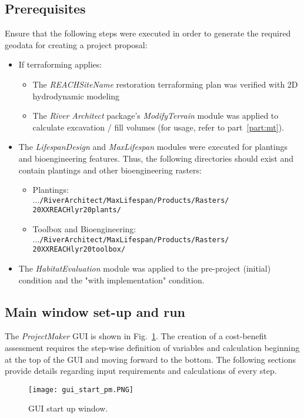 \subsection{Prerequisites}\label{sec:pmprereq}
Ensure that the following steps were executed in order to generate the required geodata for creating a project proposal:
\begin{itemize}
\item If terraforming applies:
  \begin{itemize}
  \item The \emph{REACH{\myUnderscore}SiteName} restoration terraforming plan was verified with 2D hydrodynamic modeling
  \item The \emph{River Architect} package's \emph{ModifyTerrain} module was applied to calculate excavation / fill volumes (for usage, refer to part~\ref{part:mt}).
  \end{itemize}
\item The \emph{LifespanDesign} and \emph{MaxLifespan} modules were executed for plantings and bioengineering features. Thus, the following directories should exist and contain plantings and other bioengineering rasters:
  \begin{itemize}
  \item Plantings:\\
    \texttt{$\ldots{}$/RiverArchitect/MaxLifespan/Products/Rasters/}\\ \texttt{20XX{\myUnderscore}REACH{\myUnderscore}lyr20{\myUnderscore}plants/}
  \item Toolbox and Bioengineering:\\
    \texttt{$\ldots{}$/RiverArchitect/MaxLifespan/Products/Rasters/}\\ \texttt{20XX{\myUnderscore}REACH{\myUnderscore}lyr20{\myUnderscore}toolbox/}
  \end{itemize}
\item The \emph{HabitatEvaluation} module was applied to the pre-project (initial) condition and the "with implementation" condition.
\end{itemize}

\subsection{Main window set-up and run} 
The \textit{ProjectMaker} GUI is shown in Fig.~\ref{fig:gui_start_pm}. The creation of a cost-benefit assessment requires the step-wise definition of variables and calculation beginning at the top of the GUI and moving forward to the bottom. The following sections provide details regarding input requirements and calculations of every step.
\begin{figure}[!h]
	\begin{center}
	\texttt{[image: gui\_start\_pm.PNG]}
	\caption{GUI start up window. \label{fig:gui_start_pm}}
	\end{center}
\end{figure}

